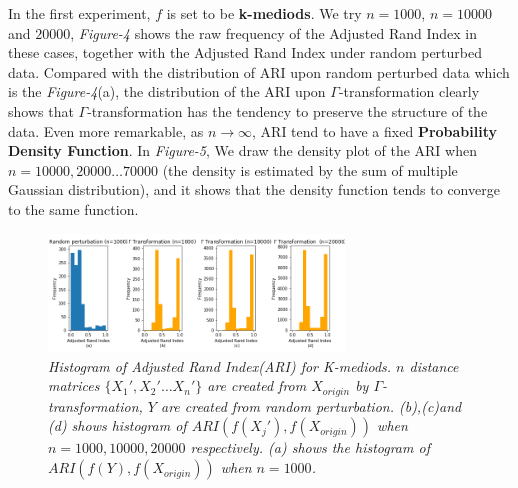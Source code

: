 \documentclass{uonmathreport}
\begin{document}
In the first experiment, $f$ is set to be \textbf{k-mediods}. We try $n=1000$, $n=10000$ and $20000$, \textit{Figure-4} shows the raw frequency of the Adjusted Rand Index in these cases, together with the Adjusted Rand Index under random perturbed data. Compared with the distribution of ARI upon random perturbed data which is the \textit{Figure-4}(a), the distribution of the ARI upon $\Gamma$-transformation clearly shows that $\Gamma$-transformation has the tendency to preserve the structure of the data. Even more remarkable, as $n \rightarrow \infty$, ARI tend to have a fixed \textbf{Probability Density Function}. In \textit{Figure-5}, We draw the density plot of the ARI when $n=10000,20000\ldots 70000$ (the density is estimated by the sum of multiple Gaussian distribution), and it shows that the density function tends to converge to the same function.
\begin{figure}[H]
 \begin{center}
   \includegraphics[width=0.7\textwidth]{simulate1.png}
 \end{center}
 \caption{\textit{Histogram of Adjusted Rand Index(ARI) for K-mediods. $n$ distance matrices $\{X_1',X_2'\ldots X_n'\}$ are created from $X_{origin}$ by $\Gamma$-transformation, $Y$ are created from random perturbation. (b),(c)and (d) shows histogram of $ARI(f(X_j'),f(X_{origin}))$ when $n=1000,10000,20000$ respectively.
(a) shows the histogram of $ARI(f(Y),f(X_{origin}))$ when $n =1000$.}}
 \label{fig:bsd}
\end{figure}
\end{document}
